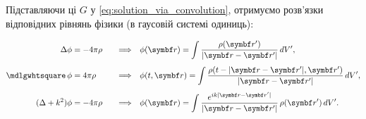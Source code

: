 \medskip
Підставляючи ці $G$ у \eqref{eq:solution_via_convolution}, отримуємо розв'язки відповідних рівнянь фізики (в гаусовій системі одиниць):

\begin{align}
    \Laplasian \phi &= -4\pi \rho \quad &\Longrightarrow& \quad \phi(\vect{r}) = \int \frac{\rho(\vect{r}')}{|\vect{r} - \vect{r}'|} \, dV', \\[4pt]
    \Dalambertian \phi &= 4\pi \rho \quad &\Longrightarrow& \quad \phi(t, \vect{r}) = \int \frac{\rho(t - |\vect{r} - \vect{r}'|, \vect{r}')}{|\vect{r} - \vect{r}'|} \, dV', \\[4pt]
    (\Laplasian + k^2)\phi &= -4\pi \rho \quad &\Longrightarrow& \quad \phi(\vect{r}) = \int \frac{e^{ik|\vect{r} - \vect{r}'|}}{|\vect{r} - \vect{r}'|}\,\rho(\vect{r}')\, dV'.
\end{align}


